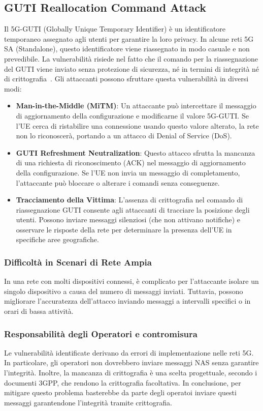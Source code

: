 \documentclass[english]{article}
\begin{document}
\subsection{GUTI Reallocation Command Attack}
Il 5G-GUTI (Globally Unique Temporary Identifier) è un identificatore
temporaneo assegnato agli utenti per garantire la loro privacy. In alcune reti
5G SA (Standalone), questo identificatore viene riassegnato in modo casuale e
non prevedibile. La vulnerabilità risiede nel fatto che il comando per la
riassegnazione del GUTI viene inviato senza protezione di sicurezza, né in
termini di integrità né di crittografia~\cite{eleftherakis2024demystifying}.
Gli attaccanti possono sfruttare questa vulnerabilità in diversi modi:
\begin{itemize}
	\item \textbf{Man-in-the-Middle (MiTM)}: Un attaccante può intercettare il messaggio di aggiornamento della configurazione e modificarne il valore 5G-GUTI. Se l'UE cerca di ristabilire una connessione usando questo valore alterato, la rete non lo riconoscerà, portando a un attacco di Denial of Service (DoS).
	\item \textbf{GUTI Refreshment Neutralization}: Questo attacco sfrutta la mancanza di una richiesta di riconoscimento (ACK) nel messaggio di aggiornamento della configurazione. Se l'UE non invia un messaggio di completamento, l'attaccante può bloccare o alterare i comandi senza conseguenze.
	\item \textbf{Tracciamento della Vittima}: L'assenza di crittografia nel comando di riassegnazione GUTI consente agli attaccanti di tracciare la posizione degli utenti. Possono inviare messaggi silenziosi (che non attivano notifiche) e osservare le risposte della rete per determinare la presenza dell'UE in specifiche aree geografiche.
\end{itemize}

\subsubsection{Difficoltà in Scenari di Rete Ampia}
In una rete con molti dispositivi connessi, è complicato per l'attaccante
isolare un singolo dispositivo a causa del numero di messaggi inviati.
Tuttavia, possono migliorare l'accuratezza dell'attacco inviando messaggi a
intervalli specifici o in orari di bassa attività.

\subsubsection{Responsabilità degli Operatori e contromisura}
Le vulnerabilità identificate derivano da errori di implementazione nelle reti
5G. In particolare, gli operatori non dovrebbero inviare messaggi NAS senza
garantire l'integrità. Inoltre, la mancanza di crittografia è una scelta
progettuale, secondo i documenti 3GPP, che rendono la crittografia facoltativa.
In conclusione, per mitigare questo problema basterebbe da parte degli operatoi
inviare questi messaggi garantendone l'integrità tramite crittografia.
\end{document}
